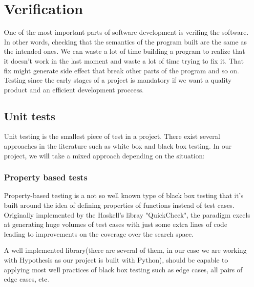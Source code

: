 \section{Verification}
  One of the most important parts of software development is verifing the
  software. In other words, checking that the semantics of the program built
  are the same as the intended ones. We can waste a lot of time building a
  program to realize that it doesn't work in the last moment and waste a lot
  of time trying to fix it. That fix might generate side effect that break other
  parts of the program and so on. Testing since the early stages of a project
  is mandatory if we want a quality product and an efficient development
  proccess.

  \subsection{Unit tests}

    Unit testing is the smallest piece of test in a project. There exist several
    approaches in the literature such as white box and black box testing. In
    our project, we will take a mixed approach depending on the situation:

    \subsubsection{Property based tests}

    Property-based testing is a not so well known type of black box testing that
    it's built around the idea of defining properties of functions instead of
    test cases. Originally implemented by the Haskell's libray
    "QuickCheck"\cite{QuickCheck}, the paradigm excels at generating huge
    volumes of test cases with just some extra lines of code leading
    to improvements on the coverage over the search space.

    A well implemented library(there are several of them, in our case we are
    working with Hypothesis\cite{Hypothesis} as our project is built with
    Python), should be capable to applying most well practices of black box
    testing such as edge cases, all pairs of edge cases, etc. 
